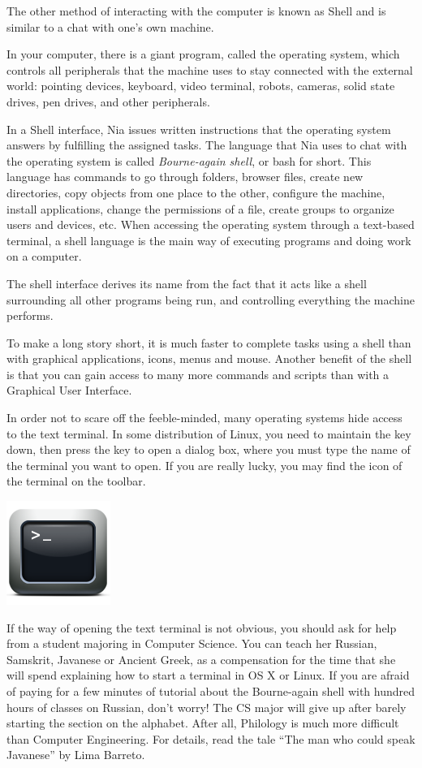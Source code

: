 \documentclass[a4paper,12pt]{book}
\begin{document}
The other method of interacting with
the computer is known as Shell and is similar to
a chat with one's own machine.

 In your computer, there is a giant
program, called the operating system, which controls
all peripherals that the machine uses to
stay connected with the external world:
pointing devices,  keyboard,
video terminal, robots, cameras, solid
state drives, pen drives, and other peripherals.

In a Shell interface, Nia issues written instructions
that the operating system answers by fulfilling the
assigned tasks. The language that Nia
uses to chat with the operating
system is called {\em Bourne-again shell}, or
bash for short. This language has
commands to go through folders, browser
files, create new directories, copy
objects from one place to the other,
configure the machine, install
applications, change the permissions
of a file, create groups to organize
users and devices, etc.
When accessing the operating system through
a text-based terminal, a shell language is the main way
of executing programs and doing work on a computer.

The shell interface derives its name from
the fact that it acts like a shell
surrounding all other programs being run,
and controlling everything the machine performs.

To make a long story short,
it is much faster to complete tasks
using a shell than with graphical applications,
icons, menus and mouse. Another benefit of the
shell is that you can gain access to many
more commands and scripts than with
a Graphical User Interface.

In order not to scare off the feeble-minded,
many operating systems hide access
to the text terminal. In some distribution
of Linux, you need to maintain the  key
down, then press the  key to open a
dialog box, where you must type the
name of the terminal you want to open.
If you are really lucky, you may find
the icon of the terminal  on the
toolbar.

\includegraphics[scale=0.8]{figs/terminal.png}

If the way of opening the text terminal
is not obvious, you should ask for help
from a student majoring in Computer Science.
You can teach her Russian, Samskrit, Javanese
or Ancient Greek, as a compensation
for the time that she will spend explaining
how to start a terminal in 
OS X or Linux. If you are afraid
of paying for a few minutes of tutorial
about the Bourne-again shell
with hundred hours of classes on
Russian, don't worry! The CS
major will give up after barely
starting the section on the alphabet. After all,
Philology is much more difficult
than Computer Engineering.
For details, read the tale ``The man who could speak
Javanese'' by Lima Barreto.
\end{document}
